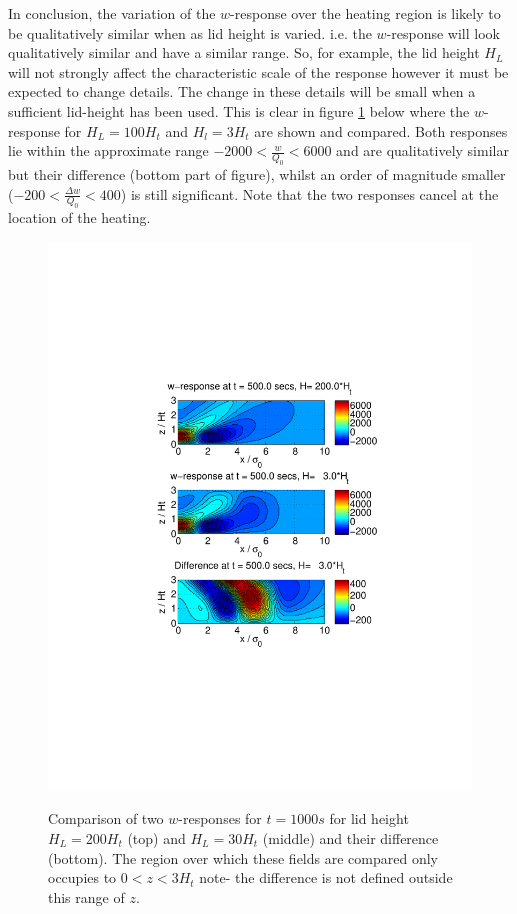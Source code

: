 \documentclass[12pt]{article}
\begin{document}
In conclusion, the variation of the $w$-response over the heating region is likely to be qualitatively similar when as lid height is varied. 
i.e. the $w$-response will look qualitatively similar and have a similar range. So, for example, the lid height $H_L$ will not strongly affect the characteristic scale of the response 
however it must be expected to change details. The change in these details will be small when a sufficient lid-height has been used. This is clear in figure \ref{fig_1a} below 
where the $w$-response for $H_L=100H_t$ and $H_l=3H_t$ are shown and compared. Both responses lie within the approximate range $-2000<\frac{w}{Q_0}<6000$ and are 
qualitatively similar but their difference (bottom part of figure), whilst an order of magnitude smaller ($-200<\frac{\Delta w}{Q_0}<400$) is still significant. Note that the two responses
cancel at the location of the heating.
%
%
%
\begin{figure}[h]
\caption{Comparison of two $w$-responses for $t=1000s$ for lid height $H_L=200H_t$ (top) and $H_L=30H_t$ (middle) and their difference (bottom). The region
over which these fields are compared only occupies to $0<z<3H_t$ note- the difference is not defined outside this range of $z$.} 
\includegraphics[scale=0.8,angle=0] {fig1a.pdf} 
\label{fig_1a}
\end{figure}
%
%
%
\end{document}
